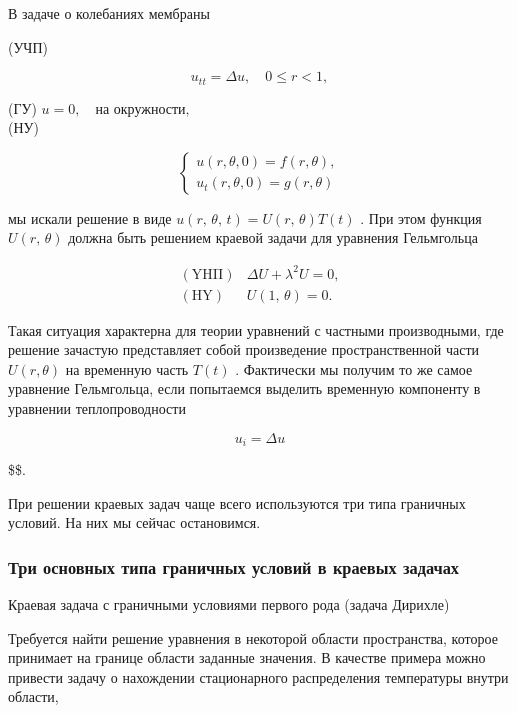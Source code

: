 \documentclass[
  ukrainian,
]{article}
\begin{document}
В задаче о колебаниях мембраны

(УЧП)

\[
u_{tt} = \Delta u, \quad 0 \le r < 1,
\]

(ГУ) \(u = 0, \quad \text{на окружности,}\)\\
(НУ)

\[
\begin{cases} u(r, \theta, 0) = f(r, \theta), \\ u_t(r, \theta, 0) = g(r, \theta) \end{cases}
\]

мы искали решение в виде
\(u\left(r,\,\theta,\,t\right)=U\left(r,\,\theta\right)T\left(t\right)\)
. При этом функция \(U\left(r,\,\theta\right)\) должна быть решением
краевой задачи для уравнения Гельмгольца

\[
\begin{array}{ll} (\mathrm{Y}\mathrm{H}\mathrm{\Pi}) & \Delta U + \lambda^2 U = 0, \\ (\mathrm{H}\mathrm{Y}) & U\left(1,\,\theta\right) = 0. \end{array}
\]

Такая ситуация характерна для теории уравнений с частными производными,
где решение зачастую представляет собой произведение пространственной
части \(U\left(r,\theta\right)\) на временную часть \(T\left(t\right)\)
. Фактически мы получим то же самое уравнение Гельмгольца, если
попытаемся выделить временную компоненту в уравнении теплопроводности

\[
u_i = \Delta u
\]

\$\$.

При решении краевых задач чаще всего используются три типа граничных
условий. На них мы сейчас остановимся.

\subsubsection{Три основных типа граничных условий в краевых
задачах}\label{ux442ux440ux438-ux43eux441ux43dux43eux432ux43dux44bux445-ux442ux438ux43fux430-ux433ux440ux430ux43dux438ux447ux43dux44bux445-ux443ux441ux43bux43eux432ux438ux439-ux432-ux43aux440ux430ux435ux432ux44bux445-ux437ux430ux434ux430ux447ux430ux445}

Краевая задача с граничными условиями первого рода (задача Дирихле)

Требуется найти решение уравнения в некоторой области пространства,
которое принимает на границе области заданные значения. В качестве
примера можно привести задачу о нахождении стационарного распределения
температуры внутри области,
\end{document}
